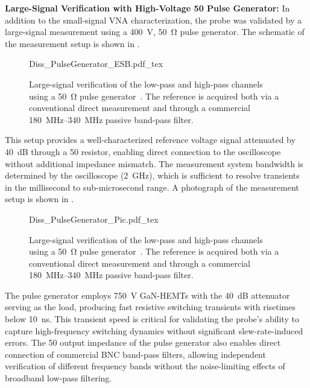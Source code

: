 \textbf{Large-Signal Verification with High-Voltage \SI{50}{\Omega} Pulse Generator:}
In addition to the small-signal VNA characterization, the probe was validated by a large-signal measurement using a \SI{400}{V}, \SI{50}{\ohm} pulse generator.
The schematic of the measurement setup is shown in .

\begin{figure}[ht]
	\centering
	{Diss_PulseGenerator_ESB.pdf_tex}
	\caption{Large-signal verification of the low-pass and high-pass channels using a \SI{50}{\ohm} pulse generator~\cite{kragl_active_2025}. The reference is acquired both via a conventional direct measurement and through a commercial \SI{180}{MHz}--\SI{340}{MHz} passive band-pass filter.}\label{fig:MS_PulsGen_ESB}
\end{figure}

This setup provides a well-characterized reference voltage signal attenuated by \SI{40}{dB} through a \SI{50}{\Omega} resistor, enabling direct connection to the oscilloscope without additional impedance mismatch.
The measurement system bandwidth is determined by the oscilloscope (\SI{2}{GHz}), which is sufficient to resolve transients in the millisecond to sub-microsecond range.
A photograph of the measurement setup is shown in .

\begin{figure}[ht]
	\centering
	{Diss_PulseGenerator_Pic.pdf_tex}
	\caption{Large-signal verification of the low-pass and high-pass channels using a \SI{50}{\ohm} pulse generator~\cite{kragl_active_2025}. The reference is acquired both via a conventional direct measurement and through a commercial \SI{180}{MHz}--\SI{340}{MHz} passive band-pass filter.}\label{fig:MS_PulsGen_Pic}
\end{figure}

The pulse generator employs \SI{750}{V} GaN-HEMTs with the \SI{40}{dB} attenuator serving as the load, producing fast resistive switching transients with risetimes below \SI{10}{ns}.
This transient speed is critical for validating the probe's ability to capture high-frequency switching dynamics without significant slew-rate-induced errors.
The \SI{50}{\Omega} output impedance of the pulse generator also enables direct connection of commercial BNC band-pass filters, allowing independent verification of different frequency bands without the noise-limiting effects of broadband low-pass filtering.


